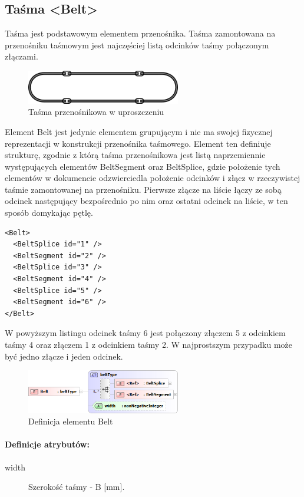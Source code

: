 \documentclass[12pt,a4paper]{article}
\begin{document}
\subsection{Taśma <Belt>}
Taśma jest podstawowym elementem przenośnika. Taśma zamontowana na przenośniku
taśmowym jest najczęściej listą odcinków taśmy połączonym złączami.

\begin{figure}[h]
  \centering
  \includegraphics[width=0.6\textwidth]{png/tasma}
  \caption{Taśma przenośnikowa w uproszczeniu}
  \label{fig:belt-xsd}
\end{figure}

Element Belt jest jedynie elementem grupującym i nie ma swojej fizycznej
reprezentacji w konstrukcji przenośnika taśmowego. Element ten definiuje
strukturę, zgodnie z którą taśma przenośnikowa jest listą naprzemiennie
występujących elementów BeltSegment oraz BeltSplice, gdzie położenie tych
elementów w dokumencie odzwierciedla położenie odcinków i złącz w rzeczywistej
taśmie zamontowanej na przenośniku. Pierwsze złącze na liście łączy ze sobą
odcinek następujący bezpośrednio po nim oraz ostatni odcinek na liście, w ten
sposób domykając pętlę.

\begin{verbatim}
<Belt>
  <BeltSplice id="1" />
  <BeltSegment id="2" />
  <BeltSplice id="3" />
  <BeltSegment id="4" />
  <BeltSplice id="5" />
  <BeltSegment id="6" />
</Belt>
\end{verbatim}

W powyższym listingu odcinek taśmy 6 jest połączony złączem 5 z odcinkiem taśmy
4 oraz złączem 1 z odcinkiem taśmy 2. W najprostszym przypadku może być jedno
złącze i jeden odcinek.

\begin{figure}[h]
  \centering
  \includegraphics[width=0.6\textwidth]{png/belt_xsd2}
  \caption{Definicja elementu Belt}
  \label{fig:belt-xsd}
\end{figure}

\paragraph{Definicje atrybutów:}
\begin{description}
\item[width] Szerokość taśmy - B [mm].
\end{description}
\end{document}
